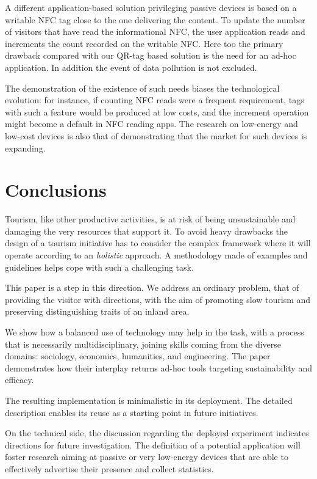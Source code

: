 \documentclass[sustainability,article,submit,pdftex,moreauthors]{Definitions/mdpi}
\begin{document}
A different application-based solution privileging passive devices is based on a writable NFC tag close to the one delivering the content. To update the number of visitors that have read the informational NFC, the user application reads and increments the count recorded on the writable NFC. Here too the primary drawback compared with our QR-tag based solution is the need for an ad-hoc application. In addition the event of data pollution is not excluded.

The demonstration of the existence of such needs biases the technological evolution: for instance, if counting NFC reads were a frequent requirement, tags with such a feature would be produced at low costs, and the increment operation might become a default in NFC reading apps. The research on low-energy and low-cost devices is also that of demonstrating that the market for such devices is expanding.

\section{Conclusions}

Tourism, like other productive activities, is at risk of being unsustainable and damaging the very resources that support it. To avoid heavy drawbacks the design of a tourism initiative has to consider the complex framework where it will operate according to an \emph{holistic} approach. A methodology made of examples and guidelines helps cope with such a challenging task.

This paper is a step in this direction. We address an ordinary problem, that of providing the visitor with directions, with the aim of promoting slow tourism and preserving distinguishing traits of an inland area.

We show how a balanced use of technology may help in the task, with a process that is necessarily multidisciplinary, joining skills coming from the diverse domains: sociology, economics, humanities, and engineering. The paper demonstrates how their interplay returns ad-hoc tools targeting sustainability and efficacy.

The resulting implementation is minimalistic in its deployment. The detailed description enables its reuse as a starting point in future initiatives.

On the technical side, the discussion regarding the deployed experiment indicates directions for future investigation. The definition of a potential application will foster research aiming at passive or very low-energy devices that are able to effectively advertise their presence and collect statistics.
\end{document}
